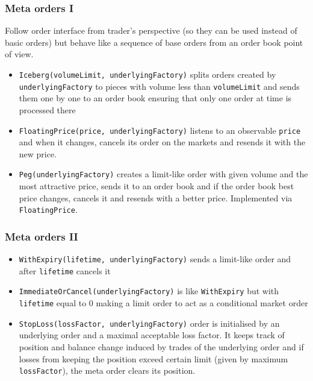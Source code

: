 \documentclass{beamer}
\begin{document}
\begin{frame}
\frametitle{Meta orders I}
Follow order interface from trader's perspective (so they can be used instead of basic orders) but behave like a sequence of base orders from an order book point of view.
\begin{itemize}
  \item \texttt{Iceberg(volumeLimit, underlyingFactory)} splits orders created by \texttt{underlyingFactory} to pieces with volume less than \texttt{volumeLimit} and sends them one by one to an order book ensuring that only one order at time is processed there
  \item \texttt{FloatingPrice(price, underlyingFactory)} listens to an observable \texttt{price} and when it changes, cancels its order on the markets and resends it with the new price.
  \item \texttt{Peg(underlyingFactory)} creates a limit-like order with given volume and the most attractive price, sends it to an order book and if the order book best price changes, cancels it and resends with a better price. Implemented via \texttt{FloatingPrice}.
\end{itemize}
\end{frame}

\begin{frame}
\frametitle{Meta orders II}
\begin{itemize}
  \item \texttt{WithExpiry(lifetime, underlyingFactory)} sends a limit-like order and after \texttt{lifetime} cancels it
  \item \texttt{ImmediateOrCancel(underlyingFactory)} is like \texttt{WithExpiry} but with \texttt{lifetime} equal to 0 making a limit order to act as a conditional market order
  \item \texttt{StopLoss(lossFactor, underlyingFactory)} order is initialised by an underlying order and a maximal acceptable loss factor.
      It keeps track of position and balance change induced by trades of the underlying order and
      if losses from keeping the position exceed certain limit (given by maximum \texttt{lossFactor}),
      the meta order clears its position.
\end{itemize}
\end{frame}
\end{document}

